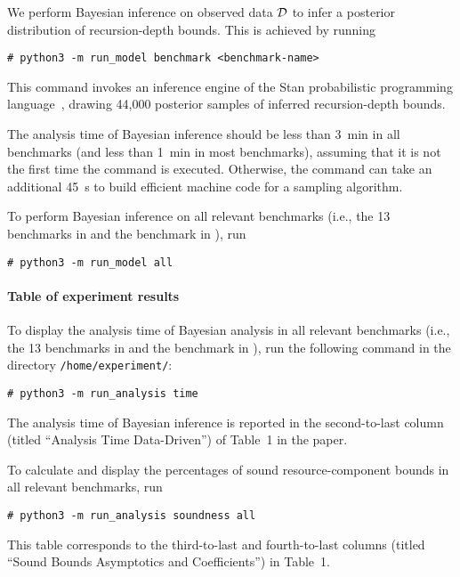 We perform Bayesian inference on observed data $\mathcal{D}$ to infer a posterior
distribution of recursion-depth bounds.
%
This is achieved by running
\begin{verbatim}
# python3 -m run_model benchmark <benchmark-name>
\end{verbatim}
%
This command invokes an inference engine of the Stan probabilistic programming
language~\citep{Carpenter2017}, drawing 44,000 posterior samples of inferred
recursion-depth bounds.

The analysis time of Bayesian inference should be less than \qty{3}{\minute} in
all benchmarks (and less than \qty{1}{\minute} in most benchmarks), assuming
that it is not the first time the command is executed.
%
Otherwise, the command can take an additional \qty{45}{\second} to build
efficient machine code for a sampling algorithm.

To perform Bayesian inference on all relevant benchmarks (i.e., the 13
benchmarks in  and the benchmark
\quicksorttiml{} in ), run
\begin{verbatim}
# python3 -m run_model all
\end{verbatim}

\paragraph{Table of experiment results}

To display the analysis time of Bayesian analysis in all relevant benchmarks
(i.e., the 13 benchmarks in  and the
benchmark \quicksorttiml{} in ), run the
following command in the directory \texttt{/home/experiment/}:
\begin{verbatim}
# python3 -m run_analysis time
\end{verbatim}
%
The analysis time of Bayesian inference is reported in the second-to-last column
(titled ``Analysis Time Data-Driven'') of Table~1 in the paper.

To calculate and display the percentages of sound resource-component bounds in
all relevant benchmarks, run
\begin{verbatim}
# python3 -m run_analysis soundness all
\end{verbatim}
%
This table corresponds to the third-to-last and fourth-to-last columns (titled
``Sound Bounds Asymptotics and Coefficients'') in Table~1.

